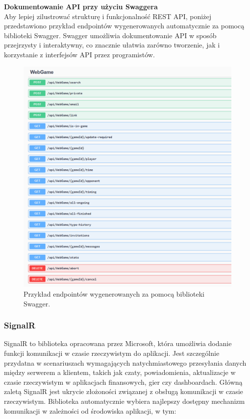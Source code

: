 \documentclass[twoside]{projektInzynierskiMS1}
\begin{document}
\newpage

\noindent \textbf{Dokumentowanie API przy użyciu Swaggera}\\
Aby lepiej zilustrować strukturę i funkcjonalność REST API, poniżej przedstawiono przykład endpointów wygenerowanych automatycznie za pomocą biblioteki Swagger. Swagger umożliwia dokumentowanie API w sposób przejrzysty i interaktywny, co znacznie ułatwia zarówno tworzenie, jak i korzystanie z interfejsów API przez programistów.

\vspace{0.5cm}
\begin{figure}[h!]
    \centering
    \includegraphics[width=1\textwidth]{images/swagger_api.png}
    \caption{Przykład endpointów wygenerowanych za pomocą biblioteki Swagger.}
\end{figure}

\newpage

\subsubsection{SignalR}

\noindent
SignalR to biblioteka opracowana przez Microsoft, która umożliwia dodanie funkcji komunikacji w czasie rzeczywistym do aplikacji. Jest szczególnie przydatna w scenariuszach wymagających natychmiastowego przesyłania danych między serwerem a klientem, takich jak czaty, powiadomienia, aktualizacje w czasie rzeczywistym w aplikacjach finansowych, gier czy dashboardach. Główną zaletą SignalR jest ukrycie złożoności związanej z obsługą komunikacji w czasie rzeczywistym. Biblioteka automatycznie wybiera najlepszy dostępny mechanizm komunikacji w zależności od środowiska aplikacji, w tym:
\end{document}
